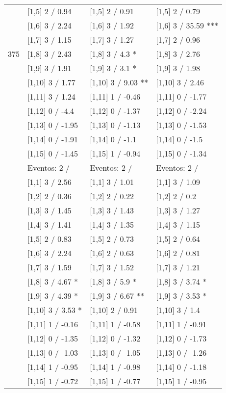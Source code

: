 \begin{table}
\begin{tabular}[t]{llll}
 & {}[1,5] 2  / 0.94 & {}[1,5] 2  / 0.91 & {}[1,5] 2  / 0.79\\
 & {}[1,6] 3  / 2.24 & {}[1,6] 3  / 1.92 & {}[1,6] 3  / 35.59 ***\\
 & {}[1,7] 3  / 1.15 & {}[1,7] 3  / 1.27 & {}[1,7] 2  / 0.96\\
375 & {}[1,8] 3  / 2.43 & {}[1,8] 3  / 4.3 * & {}[1,8] 3  / 2.76\\
\addlinespace
 & {}[1,9] 3  / 1.91 & {}[1,9] 3  / 3.1 * & {}[1,9] 3  / 1.98\\
 & {}[1,10] 3  / 1.77 & {}[1,10] 3  / 9.03 ** & {}[1,10] 3  / 2.46\\
 & {}[1,11] 3  / 1.24 & {}[1,11] 1  / -0.46 & {}[1,11] 0  / -1.77\\
 & {}[1,12] 0  / -4.4 & {}[1,12] 0  / -1.37 & {}[1,12] 0  / -2.24\\
 & {}[1,13] 0  / -1.95 & {}[1,13] 0  / -1.13 & {}[1,13] 0  / -1.53\\
\addlinespace
 & {}[1,14] 0  / -1.91 & {}[1,14] 0  / -1.1 & {}[1,14] 0  / -1.5\\
 & {}[1,15] 0  / -1.45 & {}[1,15] 1  / -0.94 & {}[1,15] 0  / -1.34\\
 & Eventos:  2 / & Eventos:  2 / & Eventos:  2 /\\
 & {}[1,1] 3  / 2.56 & {}[1,1] 3  / 1.01 & {}[1,1] 3  / 1.09\\
 & {}[1,2] 2  / 0.36 & {}[1,2] 2  / 0.22 & {}[1,2] 2  / 0.2\\
\addlinespace
 & {}[1,3] 3  / 1.45 & {}[1,3] 3  / 1.43 & {}[1,3] 3  / 1.27\\
 & {}[1,4] 3  / 1.41 & {}[1,4] 3  / 1.35 & {}[1,4] 3  / 1.15\\
 & {}[1,5] 2  / 0.83 & {}[1,5] 2  / 0.73 & {}[1,5] 2  / 0.64\\
 & {}[1,6] 3  / 2.24 & {}[1,6] 2  / 0.63 & {}[1,6] 2  / 0.81\\
 & {}[1,7] 3  / 1.59 & {}[1,7] 3  / 1.52 & {}[1,7] 3  / 1.21\\
\addlinespace
500 & {}[1,8] 3  / 4.67 * & {}[1,8] 3  / 5.9 * & {}[1,8] 3  / 3.74 *\\
 & {}[1,9] 3  / 4.39 * & {}[1,9] 3  / 6.67 ** & {}[1,9] 3  / 3.53 *\\
 & {}[1,10] 3  / 3.53 * & {}[1,10] 2  / 0.91 & {}[1,10] 3  / 1.4\\
 & {}[1,11] 1  / -0.16 & {}[1,11] 1  / -0.58 & {}[1,11] 1  / -0.91\\
 & {}[1,12] 0  / -1.35 & {}[1,12] 0  / -1.32 & {}[1,12] 0  / -1.73\\
\addlinespace
 & {}[1,13] 0  / -1.03 & {}[1,13] 0  / -1.05 & {}[1,13] 0  / -1.26\\
 & {}[1,14] 1  / -0.95 & {}[1,14] 1  / -0.98 & {}[1,14] 0  / -1.18\\
 & {}[1,15] 1  / -0.72 & {}[1,15] 1  / -0.77 & {}[1,15] 1  / -0.95\\
\bottomrule
\end{tabular}
\end{table}
